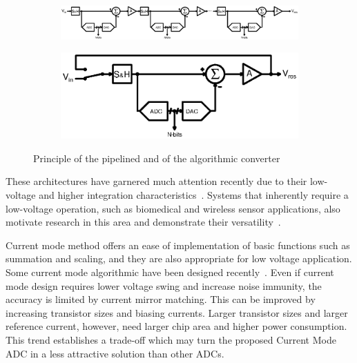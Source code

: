 \begin{figure}[htp]
	\centering
    \begin{subfigure}[b]{\textwidth}
        \includegraphics[width=\textwidth]{Chapter2/Figs/Vector/pipelined.ps}
        \label{fig:pipelined-principle}
	\end{subfigure}
	\begin{subfigure}[b]{0.4\textwidth}
        \includegraphics[width=\textwidth]{Chapter2/Figs/Vector/algorithmic.ps}
        \label{fig:algorithmic-principle}
    \end{subfigure}
	\caption{Principle of the pipelined and of the algorithmic converter}
	\label{fig:algo_desc}
\end{figure}

These architectures have garnered much attention recently due to their low-voltage and higher integration characteristics~\cite{Steyaert2012,Lee2011,SKLee2011,Brooks2009,Hershberg2012,YLim2015,YLim2015FD,Megawer2016,YCao2017}. Systems that inherently require a low-voltage operation, such as biomedical and wireless sensor applications, also motivate research in this area and demonstrate their versatility~\cite{Steyaert2012,Lee2011,SKLee2011}.


Current mode method offers an ease of implementation of basic functions such as summation and scaling, and they are also appropriate for low voltage application. Some current mode algorithmic have been designed recently~\cite{Nairn1990,Wang1991,Khodabndehloo2009,Bhatia2011}. Even if current mode design requires lower voltage swing and increase noise immunity, the accuracy is limited by current mirror matching. This can be improved by increasing transistor sizes and biasing currents. Larger transistor sizes and larger reference current, however, need larger chip area and higher power consumption. This trend establishes a trade-off which may turn the proposed Current Mode ADC in a less attractive solution than other ADCs\cite{Wang1991}.

